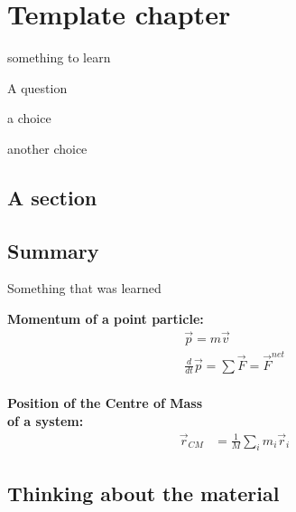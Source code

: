 
\chapter{Template chapter}
\label{chapter:template}


\begin{learningObjectives}{
 \item something to learn
 }
\end{learningObjectives}

\begin{opening}
\begin{MCquestion}{A question}
\item a choice
\item another choice \correct
\end{MCquestion}
\end{opening}

\section{A section}



\newpage
\section{Summary}

\begin{chapterSummary}
 Something that was learned
\end{chapterSummary}

\newpage
\begin{importantEquations}
\medskip
\begin{multicols}{2}
\textbf{Momentum of a point particle:}
\begin{align*}
\vec p = m\vec v \\
\frac{d}{dt}\vec p = \sum \vec F = \vec F^{net}
\end{align*}
\columnbreak
\\
\textbf{Position of the Centre of Mass \\ of a system:}
\begin{align*}
\vec r_{CM} &=\frac{1}{M}\sum_i m_i\vec r_i 
\end{align*}
\medskip
\end{multicols}
\end{importantEquations}

\newpage
\section{Thinking about the material}


